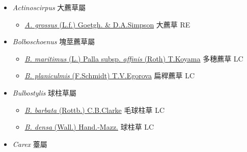 
  \begin{itemize}
 \item[] \textit{Actinoscirpus} 大藨草屬
                                
  \begin{itemize}
        \item[] \href{http://www.theplantlist.org/tpl1.1/search?q=Actinoscirpus+grossus}{\textit{A. grossus} (L.f.) Goetgh. \& D.A.Simpson}   大藨草   RE
  \end{itemize}
 \item[] \textit{Bolboschoenus} 塊莖藨草屬
                                
  \begin{itemize}
        \item[] \href{http://www.theplantlist.org/tpl1.1/search?q=Bolboschoenus+maritimus+subsp.+affinis}{\textit{B. maritimus} (L.) Palla subsp. \textit{affinis} (Roth) T.Koyama}   多穗藨草   LC
        \item[] \href{http://www.theplantlist.org/tpl1.1/search?q=Bolboschoenus+planiculmis}{\textit{B. planiculmis} (F.Schmidt) T.V.Egorova}   扁稈藨草   LC
  \end{itemize}
 \item[] \textit{Bulbostylis} 球柱草屬
                                
  \begin{itemize}
        \item[] \href{http://www.theplantlist.org/tpl1.1/search?q=Bulbostylis+barbata}{\textit{B. barbata} (Rottb.) C.B.Clarke}   毛球柱草   LC
        \item[] \href{http://www.theplantlist.org/tpl1.1/search?q=Bulbostylis+densa}{\textit{B. densa} (Wall.) Hand.-Mazz.}   球柱草   LC
  \end{itemize}
 \item[] \textit{Carex} 薹屬
                                

\end{itemize}
